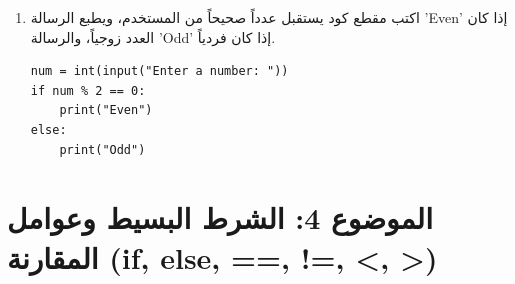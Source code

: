 \documentclass[14pt]{extarticle}
\begin{document}
\begin{enumerate}[itemsep=3em]
\item
اكتب مقطع كود يستقبل عدداً صحيحاً من المستخدم، ويطبع الرسالة '\textenglish{Even}' إذا كان العدد زوجياً، والرسالة '\textenglish{Odd}' إذا كان فردياً.

\ifwithsols
\begin{boxSolution}
\begin{english}
\begin{verbatim}
num = int(input("Enter a number: "))
if num % 2 == 0:
    print("Even")
else:
    print("Odd")
\end{verbatim}
\end{english}
\end{boxSolution}
\fi

\end{enumerate}
\clearpage

\section*{الموضوع 4: الشرط البسيط وعوامل المقارنة (\textenglish{if, else, ==, !=, <, >})}
\end{document}
